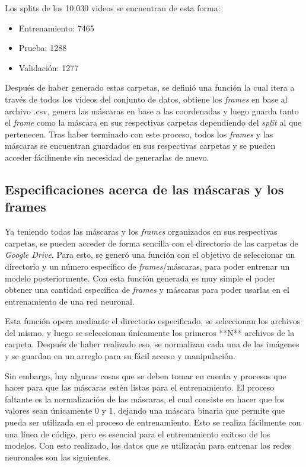 \documentclass[runningheads]{llncs}
\begin{document}
Los splits de los 10,030 videos se encuentran de esta forma:

\begin{itemize}
    \item Entrenamiento: 7465
    \item Prueba: 1288
    \item Validación: 1277
\end{itemize}

Después de haber generado estas carpetas, se definió una función la cual itera a través de todos los videos del conjunto de datos, obtiene los \textit{frames} en base al archivo .csv, genera las máscaras en base a las coordenadas y luego guarda tanto el \textit{frame} como la máscara en sus respectivas carpetas dependiendo del \textit{split} al que pertenecen. Tras haber terminado con este proceso, todos los \textit{frames} y las máscaras se encuentran guardados en sus respectivas carpetas y se pueden acceder fácilmente sin necesidad de generarlas de nuevo.

\subsection{Especificaciones acerca de las máscaras y los frames}
Ya teniendo todas las máscaras y los \textit{frames} organizados en sus respectivas carpetas, se pueden acceder de forma sencilla con el directorio de las carpetas de \textit{Google Drive}. Para esto, se generó una función con el objetivo de seleccionar un directorio y un número específico de \textit{frames}/máscaras, para poder entrenar un modelo posteriormente. Con esta función generada es muy simple el poder obtener una cantidad específica de \textit{frames} y máscaras para poder usarlas en el entrenamiento de una red neuronal.

Esta función opera mediante el directorio especificado, se seleccionan los archivos del mismo, y luego se seleccionan únicamente los primeros **N** archivos de la carpeta. Después de haber realizado eso, se normalizan cada una de las imágenes y se guardan en un arreglo para su fácil acceso y manipulación.

Sin embargo, hay algunas cosas que se deben tomar en cuenta y procesos que hacer para que las máscaras estén listas para el entrenamiento. El proceso faltante es la normalización de las máscaras, el cual consiste en hacer que los valores sean únicamente 0 y 1, dejando una máscara binaria que permite que pueda ser utilizada en el proceso de entrenamiento. Esto se realiza fácilmente con una línea de código, pero es esencial para el entrenamiento exitoso de los modelos. Con esto realizado, los datos que se utilizarán para entrenar las redes neuronales son las siguientes.
\end{document}
